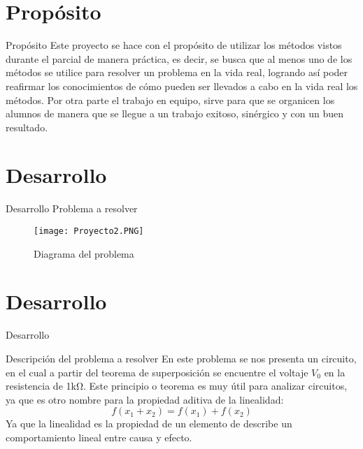 \documentclass[11pt]{beamer}
\begin{document}
    \section{Propósito}
      \begin{frame}{Propósito}
      \justifying
      Este proyecto se hace con el propósito de utilizar los métodos vistos durante el parcial de manera práctica, es decir, se busca que al menos uno de los métodos se utilice para resolver un problema en la vida real, logrando así poder reafirmar los conocimientos de cómo pueden ser llevados a cabo en la vida real los métodos.
Por otra parte el trabajo en equipo, sirve para que se organicen los alumnos de manera que se llegue a un trabajo exitoso, sinérgico y con un buen resultado.
      \end{frame}
      
    \section{Desarrollo}
      \begin{frame}{Desarrollo}
      \justifying
      Problema a resolver
      \begin{figure}[hbtp]
\caption{Diagrama del problema}
\centering
\texttt{[image: Proyecto2.PNG]}
\end{figure}
      \end{frame}
      \section{Desarrollo}
      \begin{frame}{Desarrollo}
      \begin{block}{Descripción del problema a resolver}
\justifying
En este problema se nos presenta un circuito, en el cual a partir del teorema de superposición se encuentre el voltaje $V_{0}$ en la resistencia de 1kΩ.
Este principio o teorema es muy útil para analizar circuitos, ya que es otro nombre para la  propiedad aditiva de la linealidad:
\[ 
f(x_{1}+x_{2})=f(x_{1})+f(x_{2})
\]
Ya que la linealidad es la propiedad de un elemento de describe un comportamiento lineal entre causa y efecto.
\end{block}
      \end{frame}
\end{document}
